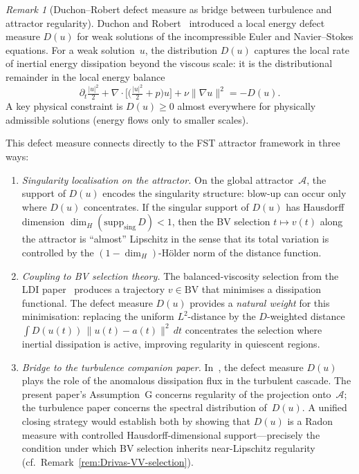 \documentclass[12pt,a4paper]{article}
\theoremstyle{definition}
\theoremstyle{plain}
\theoremstyle{remark}
\newtheorem{remark}[definition]{Remark}
\begin{document}
\begin{remark}[Duchon--Robert defect measure as bridge between turbulence and attractor regularity]
\label{rem:duchon-robert}
Duchon and Robert~\cite{DuchonRobert2000} introduced a local energy defect
measure $D(u)$ for weak solutions of the incompressible Euler and
Navier--Stokes equations.  For a weak solution~$u$, the distribution
$D(u)$ captures the local rate of inertial energy dissipation beyond
the viscous scale: it is the distributional remainder in the local
energy balance
\[
  \partial_t \tfrac{|u|^2}{2}
  + \nabla \cdot \bigl[ \bigl(\tfrac{|u|^2}{2} + p\bigr) u \bigr]
  + \nu \|\nabla u\|^2
  = -D(u).
\]
A key physical constraint is $D(u) \ge 0$ almost everywhere for
physically admissible solutions (energy flows only to smaller scales).

This defect measure connects directly to the FST attractor framework
in three ways:
\begin{enumerate}
\item \emph{Singularity localisation on the attractor.}
On the global attractor~$\mathcal{A}$, the support of $D(u)$
encodes the singularity structure: blow-up can occur only where
$D(u)$ concentrates.  If the singular support of $D(u)$ has
Hausdorff dimension $\dim_H(\mathrm{supp}_{\mathrm{sing}}\, D) < 1$,
then the BV selection $t \mapsto v(t)$ along the attractor is ``almost''
Lipschitz in the sense that its total variation is controlled by the
$(1-\dim_H)$-H\"older norm of the distance function.
\item \emph{Coupling to BV selection theory.}
The balanced-viscosity selection from the LDI
paper~\cite{Geiger2026-LDI} produces a trajectory $v \in \mathrm{BV}$
that minimises a dissipation functional.  The defect measure $D(u)$
provides a \emph{natural weight} for this minimisation: replacing the
uniform $L^2$-distance by the $D$-weighted distance
$\int D(u(t))\, \|u(t) - a(t)\|^2\, dt$ concentrates the selection
where inertial dissipation is active, improving regularity in
quiescent regions.
\item \emph{Bridge to the turbulence companion paper.}
In~\cite{FST-TU2026}, the defect measure $D(u)$ plays the role of
the anomalous dissipation flux in the turbulent cascade.  The
present paper's Assumption~G concerns regularity of the
projection onto~$\mathcal{A}$; the turbulence paper concerns
the spectral distribution of~$D(u)$.  A unified closing strategy
would establish both by showing that $D(u)$ is a Radon measure with
controlled Hausdorff-dimensional support---precisely the condition
under which BV selection inherits near-Lipschitz regularity
(cf.~Remark~\ref{rem:Drivas-VV-selection}).
\end{enumerate}
\end{remark}
\end{document}
